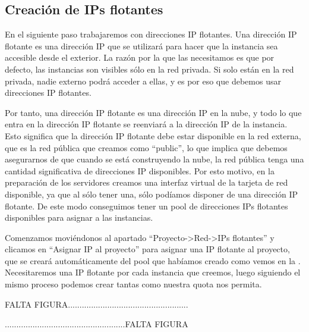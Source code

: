 \subsection{Creación de IPs flotantes}
En el siguiente paso trabajaremos con direcciones IP flotantes. Una dirección IP flotante es una dirección IP que se utilizará para hacer que la instancia sea accesible desde el exterior. La razón por la que las necesitamos es que por defecto, las instancias son visibles sólo en la red privada. Si solo están en la red privada, nadie externo podrá acceder a ellas, y es por eso que debemos usar direcciones IP flotantes.

Por tanto, una dirección IP flotante es una dirección IP en la nube, y todo lo que entra en la dirección IP flotante se reenviará a la dirección IP de la instancia. Esto significa que la dirección IP flotante debe estar disponible en la red externa, que es la red pública que creamos como “public”, lo que implica que debemos asegurarnos de que cuando se está construyendo la nube, la red pública tenga una cantidad significativa de direcciones IP disponibles. Por esto motivo, en la preparación de los servidores creamos una interfaz virtual de la tarjeta de red disponible, ya que al sólo tener una, sólo podíamos disponer de una dirección IP flotante. De este modo conseguimos tener un pool de direcciones IPs flotantes disponibles para asignar a las instancias.

Comenzamos moviéndonos al apartado “Proyecto-\textgreater Red-\textgreater IPs flotantes” y clicamos en “Asignar IP al proyecto” para asignar una IP flotante al proyecto, que se creará automáticamente del pool que habíamos creado como vemos en la %
. Necesitaremos una IP flotante por cada instancia que creemos, luego siguiendo el mismo proceso podemos crear tantas como nuestra quota nos permita. 

\begin{tcolorbox}[colback=green!5!white,colframe=green!75!black]
FALTA FIGURA....................................................

....................................................FALTA FIGURA
\end{tcolorbox}

